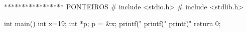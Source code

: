 ***************** PONTEIROS
# include <stdio.h>
# include <stdlib.h>

int main()
{
	int x=19;
	int *p;
	p = &x;
	printf("%
	printf("%
	printf("%
	return 0;
}

